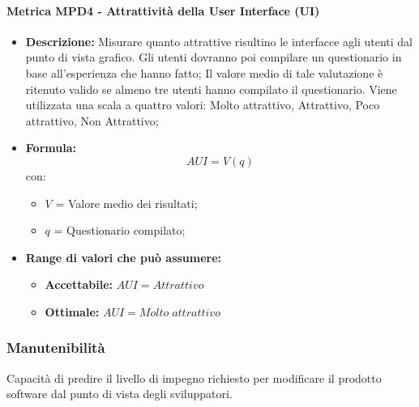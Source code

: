 \paragraph{Metrica MPD4 - Attrattività della User Interface (UI)} 
\begin{itemize}
    \item \textbf{Descrizione:} Misurare quanto attrattive risultino le interfacce agli utenti dal punto di vista grafico.
    Gli utenti dovranno poi compilare un questionario in base all'esperienza che hanno fatto;
    Il valore medio di tale valutazione è ritenuto valido se almeno tre utenti hanno compilato il questionario. 
    Viene utilizzata una scala a quattro valori: Molto attrattivo, Attrattivo, Poco attrattivo, Non Attrattivo;
\item \textbf{Formula:}$$AUI = V(q) $$
    con:
        \begin{itemize}
        \item $V$ = Valore medio dei risultati;
        \item $q$ = Questionario compilato;
        \end{itemize}
    \item \textbf{Range di valori che può assumere:}
        \begin{itemize}
            \item \textbf{Accettabile:} $AUI = Attrattivo$ 
            \item \textbf{Ottimale:} $AUI = Molto \; attrattivo$
        \end{itemize}
\end{itemize}

\subsubsection{Manutenibilità} 
Capacità di predire il livello di impegno richiesto per modificare il prodotto software dal punto di vista degli sviluppatori.           

